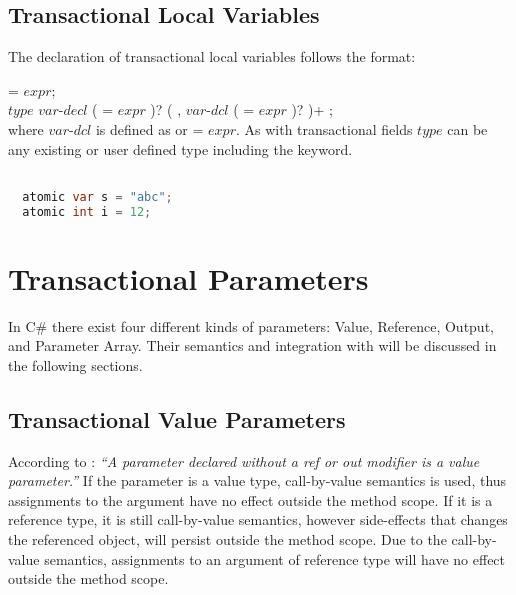 \subsection{Transactional Local Variables}
The declaration of transactional local variables follows the format:

   = $expr$;\\
 $type$ $var$-$decl$ ( = $expr$ )? ( , $var$-$dcl$ ( = $expr$ )? )+ ;\\

where $var$-$dcl$ is defined as  or  = $expr$. As with transactional fields $type$ can be any existing or user defined type including the  keyword.
\begin{lstlisting}[label=lst:local_variable,
  caption={Local Transactional Variable},
  language=Java,  
  showspaces=false,
  showtabs=false,
  breaklines=true,
  showstringspaces=false,
  breakatwhitespace=true,
  commentstyle=\color{greencomments},
  keywordstyle=\color{bluekeywords},
  stringstyle=\color{redstrings},
  morekeywords={atomic, retry, orElse, var, get, set}]  % Start your code-block

  atomic var s = "abc";
  atomic int i = 12;  
\end{lstlisting}

\section{Transactional Parameters}\label{sec:parameter_design}
In C\# there exist four different kinds of parameters: Value, Reference, Output, and Parameter Array. Their semantics and integration with \stmnamesp will be discussed in the following sections.

\subsection{Transactional Value Parameters}
According to \cite[p. 97]{csharp2013specificaiton}: \textit{``A parameter declared without a ref or out modifier is a value parameter.''} If the parameter is a value type, call-by-value semantics is used, thus assignments to the argument have no effect outside the method scope. If it is a reference type, it is still call-by-value semantics, however side-effects that changes the referenced object, will persist outside the method scope. Due to the call-by-value semantics, assignments to an argument of reference type will have no effect outside the method scope\cite[p. 76]{sestoft2011c}.


